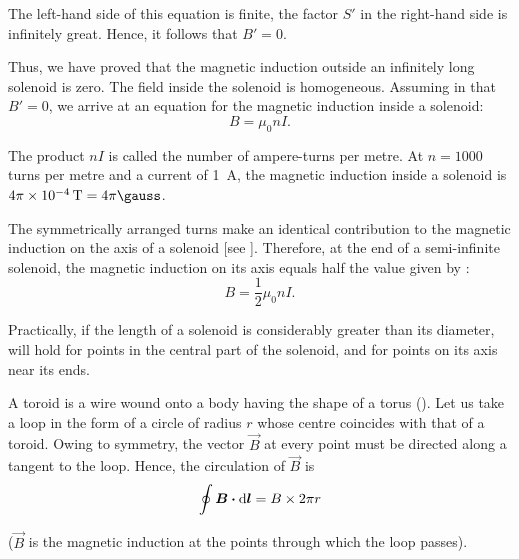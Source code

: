 The left-hand side of this equation is finite, the factor $S'$ in the right-hand side is infinitely great. Hence, it follows that $B'=0$.

Thus, we have proved that the magnetic induction outside an infinitely long solenoid is zero. The field inside the solenoid is homogeneous. Assuming in  that $B' = 0$, we arrive at an equation for the magnetic induction inside a solenoid:
\begin{equation}\label{eq:6_108}
    B = \mu_0 n I.
\end{equation}

The product $nI$ is called the number of ampere-turns per metre. At $n = 1000$ turns per metre and a current of \SI{1}{\ampere}, the magnetic induction inside a solenoid is $4\pi\times\SI{e-4}{\tesla}=4\pi \si{\gauss}$.

The symmetrically arranged turns make an identical contribution to the magnetic induction on the axis of a solenoid [see ]. Therefore, at the end of a semi-infinite solenoid, the magnetic induction on its axis equals half the value given by :
\begin{equation}\label{eq:6_109}
    B = \frac{1}{2} \mu_0 n I.
\end{equation}

Practically, if the length of a solenoid is considerably greater than its diameter,  will hold for points in the central part of the solenoid, and  for points on its axis near its ends.

A toroid is a wire wound onto a body having the shape of a torus (). Let us take a loop in the form of a circle of radius $r$ whose centre coincides with that of a toroid. Owing to symmetry,
the vector $\vec{B}$ at every point must be directed along a tangent to the loop. Hence, the circulation of $\vec{B}$ is
\begin{equation*}
    \oint \boldsymbol{B} \boldsymbol{\cdot} \mathrm{d}\boldsymbol{l} = B \times 2\pi r
\end{equation*}

\noindent
($\vec{B}$ is the magnetic induction at the points through which the loop passes).

